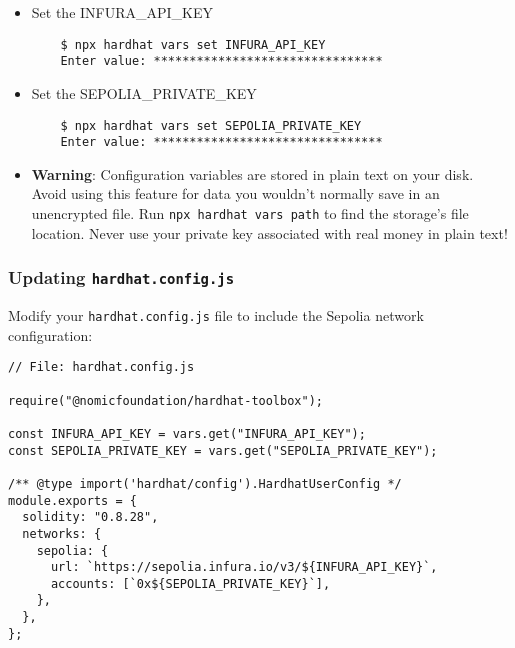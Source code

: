 \documentclass[12pt]{article}
\begin{document}
\begin{itemize}
    \item Set the INFURA\_API\_KEY

          \begin{verbatim}
    $ npx hardhat vars set INFURA_API_KEY
    Enter value: ********************************
\end{verbatim}

    \item Set the SEPOLIA\_PRIVATE\_KEY

          \begin{verbatim}
    $ npx hardhat vars set SEPOLIA_PRIVATE_KEY
    Enter value: ********************************
\end{verbatim}

\end{itemize}

\begin{itemize}
    \item \textbf{Warning}: Configuration variables are stored in plain text on your disk. Avoid using this feature for data you wouldn’t normally save in an unencrypted file. Run \texttt{npx hardhat vars path} to find the storage's file location. Never use your private key associated with real money in plain text!
\end{itemize}

\subsubsection*{Updating \texttt{hardhat.config.js}}

Modify your \texttt{hardhat.config.js} file to include the Sepolia network
configuration:

\noindent
\begin{minipage}[c]{\textwidth}
    \begin{verbatim}
// File: hardhat.config.js

require("@nomicfoundation/hardhat-toolbox");

const INFURA_API_KEY = vars.get("INFURA_API_KEY");
const SEPOLIA_PRIVATE_KEY = vars.get("SEPOLIA_PRIVATE_KEY");

/** @type import('hardhat/config').HardhatUserConfig */
module.exports = {
  solidity: "0.8.28",
  networks: {
    sepolia: {
      url: `https://sepolia.infura.io/v3/${INFURA_API_KEY}`,
      accounts: [`0x${SEPOLIA_PRIVATE_KEY}`],
    },
  },
};
\end{verbatim}
\end{minipage}
\end{document}
